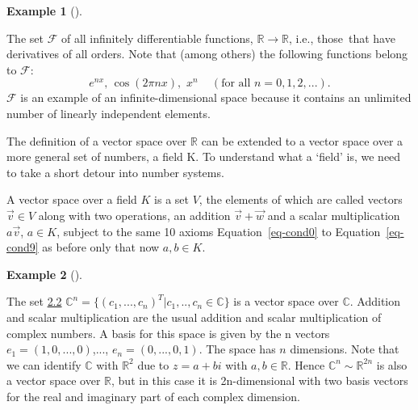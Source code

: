 \documentclass[
  a4paper,
  DIV=11,
  numbers=noendperiod,
  oneside]{scrreprt}
\theoremstyle{definition}
\newtheorem{example}{Example}[chapter]
\theoremstyle{remark}
\newenvironment{fbxSimple}[3]{\begin{tcolorbox}[enhanced, breakable,%
attach boxed title to top*={xshift=1.4pt},
boxed title style={boxrule=0.0mm, fuzzy shadow={1pt}{-1pt}{0mm}{0.1mm}{gray}, arc=.3em, rounded corners=east, sharp corners=west}, colframe=#1-color2, colbacktitle=#1-color1, colback = white, coltitle=black,  titlerule=0mm, toprule=0pt, bottomrule=.7pt, leftrule=.3em, rightrule=.7pt, outer arc=.3em,  	left=.5em, right=.5em, bottomtitle=1mm, toptitle=1mm,title=\textbf{#2}\hspace{0.5em}{#3}]}
{\end{tcolorbox}}
\begin{document}
\begin{tcolorbox}[enhanced jigsaw, opacitybacktitle=0.6, left=2mm, breakable, bottomrule=.15mm, colbacktitle=quarto-callout-note-color!10!white, leftrule=.75mm, titlerule=0mm, rightrule=.15mm, toprule=.15mm, colback=white, toptitle=1mm, colframe=quarto-callout-note-color-frame, coltitle=black, bottomtitle=1mm, title=\textcolor{quarto-callout-note-color}{\faInfo}\hspace{0.5em}{Advanced material}, opacityback=0, arc=.35mm]

\begin{example}[]\protect\hypertarget{exm-vktspace8}{}\label{exm-vktspace8}

The set \(\mathcal{F}\) of all infinitely differentiable functions,
\(\mathbb{R} \rightarrow \mathbb{R}\), i.e., those~that have derivatives
of all orders. Note that (among others) the following functions belong
to \(\mathcal{F}\): \[e^{nx},\,\cos \left( 2\pi nx\right)
,\,\,x^{n}\quad \,(\text{for all }n=0,1,2,...).\] \(\mathcal{F}\) is an
example of an infinite-dimensional space because it contains an
unlimited number of linearly independent elements.

\end{example}

The definition of a vector space over \(\mathbb{R}\) can be extended to
a vector space over a more general set of numbers, a field K. To
understand what a `field' is, we need to take a short detour into number
systems.

\label{vksoverk}
\begin{fbxSimple}{Definition}{Definition: }{Vector Space over K}
\label{vksoverk}
A vector space over a field \(K\) is a set \(V\), the elements of which
are called vectors \(\vec{v} \in V\) along with two operations, an
addition \(\vec{v} + \vec{w}\) and a scalar multiplication
\(a \vec{v}\), \(a \in K\), subject to the same 10 axioms
Equation~\ref{eq-cond0} to Equation~\ref{eq-cond9} as before only that
now \(a,b\in K\).

\end{fbxSimple}

\begin{example}[]\protect\hypertarget{exm-vktspace9}{}\label{exm-vktspace9}

The set \hyperref[vksoverk]{2.2}
\(\mathbb{C}^{n} =\{ (c_{1},...,c_{n})^{T}| c_{1},..,c_{n}\in \mathbb{C}\}\)
is a vector space over \(\mathbb{C}\). Addition and scalar
multiplication are the usual addition and scalar multiplication of
complex numbers. A basis for this space is given by the n vectors
\(e_{1}=(1,0,...,0)\),..., \(e_{n}=(0,...,0,1)\). The space has \(n\)
dimensions. Note that we can identify \(\mathbb{C}\) with
\(\mathbb{R}^{2}\) due to \(z= a + b i\) with \(a,b \in \mathbb{R}\).
Hence \(\mathbb{C}^{n}  \sim \mathbb{R}^{2n}\) is also a vector space
over \(\mathbb{R}\), but in this case it is 2n-dimensional with two
basis vectors for the real and imaginary part of each complex dimension.

\end{example}

\end{tcolorbox}
\end{document}
